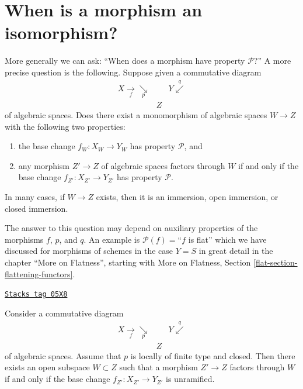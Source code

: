 \section{When is a morphism an isomorphism?}
\label{spaces-more-morphisms-section-when-isomorphism}
More generally we can ask:
``When does a morphism have property $\mathcal{P}$?''
A more precise question is the following. Suppose given a commutative diagram
$$
\begin{array}{ccc}X \underset{f}{\longrightarrow}\underset{p}{\searrow} &  & Y \overset{q}{\swarrow} \\  & Z & \end{array}
$$
of algebraic spaces. Does there exist a monomorphism of algebraic spaces
$W \to Z$ with the following two properties:
\begin{enumerate}
\item the base change $f_W : X_W \to Y_W$ has property $\mathcal{P}$, and
\item any morphism $Z' \to Z$ of algebraic spaces factors through $W$ if
and only if the base change $f_{Z'} : X_{Z'} \to Y_{Z'}$ has property
$\mathcal{P}$.
\end{enumerate}
In many cases, if $W \to Z$ exists, then it is an immersion, open immersion,
or closed immersion.

\medskip\noindent
The answer to this question may depend on auxiliary properties of the
morphisms $f$, $p$, and $q$. An example is $\mathcal{P}(f) =$``$f$ is flat''
which we have discussed for morphisms of schemes in the case $Y = S$ in
great detail in the chapter ``More on Flatness'', starting with
More on Flatness, Section \ref{flat-section-flattening-functors}.

\begin{lemma}
\label{spaces-more-morphisms-lemma-where-unramified}
\href{https://stacks.math.columbia.edu/tag/05X8}{\texttt{Stacks tag 05X8}}

Consider a commutative diagram
$$
\begin{array}{ccc}X \underset{f}{\longrightarrow}\underset{p}{\searrow} &  & Y \overset{q}{\swarrow} \\  & Z & \end{array}
$$
of algebraic spaces. Assume that $p$ is locally of finite type and closed.
Then there exists an open subspace $W \subset Z$
such that a morphism $Z' \to Z$ factors through $W$ if and only if the
base change $f_{Z'} : X_{Z'} \to Y_{Z'}$ is unramified.
\end{lemma}

